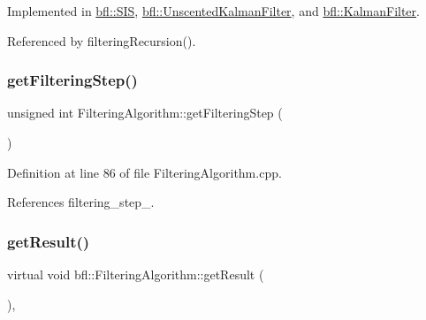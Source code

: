 Implemented in \mbox{\hyperlink{classbfl_1_1SIS_a582f06cc5456d2cc6ed8f90087cbbb4c}{bfl\+::\+S\+IS}}, \mbox{\hyperlink{classbfl_1_1UnscentedKalmanFilter_a169451bb711a03ad2dc28a40e3ad867f}{bfl\+::\+Unscented\+Kalman\+Filter}}, and \mbox{\hyperlink{classbfl_1_1KalmanFilter_aac6bd54422cba06e34cb93cb8a659950}{bfl\+::\+Kalman\+Filter}}.



Referenced by filtering\+Recursion().

\mbox{\label{classbfl_1_1FilteringAlgorithm_a8c43b1f3dac30934c0a03de348d4a29d}} 
\subsubsection{\texorpdfstring{get\+Filtering\+Step()}{getFilteringStep()}}
{\footnotesize\ttfamily unsigned int Filtering\+Algorithm\+::get\+Filtering\+Step (\begin{DoxyParamCaption}{ }\end{DoxyParamCaption})}



Definition at line 86 of file Filtering\+Algorithm.\+cpp.



References filtering\+\_\+step\+\_\+.

\mbox{\label{classbfl_1_1FilteringAlgorithm_acdfebf68405a427491e4dd9d020ae09b}} 
\subsubsection{\texorpdfstring{get\+Result()}{getResult()}}
{\footnotesize\ttfamily virtual void bfl\+::\+Filtering\+Algorithm\+::get\+Result (\begin{DoxyParamCaption}{ }\end{DoxyParamCaption})\hspace{0.3cm}{\ttfamily [protected]}, {}}



